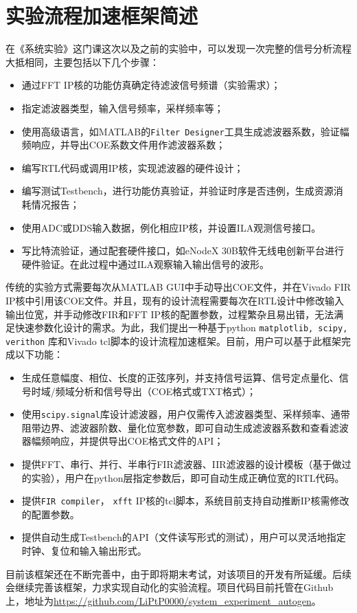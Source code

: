 \section{实验流程加速框架简述}
在《系统实验》这门课这次以及之前的实验中，可以发现一次完整的信号分析流程大抵相同，主要包括以下几个步骤：
\begin{itemize}
    \item 通过FFT IP核的功能仿真确定待滤波信号频谱（实验需求）；
    \item 指定滤波器类型，输入信号频率，采样频率等；
    \item 使用高级语言，如MATLAB的\texttt{Filter Designer}工具生成滤波器系数，验证幅频响应，并导出COE系数文件用作滤波器系数；
    \item 编写RTL代码或调用IP核，实现滤波器的硬件设计；
    \item 编写测试Testbench，进行功能仿真验证，并验证时序是否违例，生成资源消耗情况报告；
    \item 使用ADC或DDS输入数据，例化相应IP核，并设置ILA观测信号接口。
    \item 写比特流验证，通过配套硬件接口，如eNodeX 30B软件无线电创新平台进行硬件验证。在此过程中通过ILA观察输入输出信号的波形。
\end{itemize}

传统的实验方式需要每次从MATLAB GUI中手动导出COE文件，并在Vivado FIR IP核中引用该COE文件。并且，现有的设计流程需要每次在RTL设计中修改输入输出位宽，并手动修改FIR和FFT IP核的配置参数，过程繁杂且易出错，无法满足快速参数化设计的需求。为此，我们提出一种基于python \texttt{matplotlib, scipy, verithon} 库和Vivado tcl脚本的设计流程加速框架。目前，用户可以基于此框架完成以下功能：
\begin{itemize}
    \item 生成任意幅度、相位、长度的正弦序列，并支持信号运算、信号定点量化、信号时域/频域分析和信号导出（COE格式或TXT格式）；
    \item 使用\texttt{scipy.signal}库设计滤波器，用户仅需传入滤波器类型、采样频率、通带阻带边界、滤波器阶数、量化位宽参数，即可自动生成滤波器系数和查看滤波器幅频响应，并提供导出COE格式文件的API；
    \item 提供FFT、串行、并行、半串行FIR滤波器、IIR滤波器的设计模板（基于做过的实验），用户在python层指定参数后，即可自动生成正确位宽的RTL代码。
    \item 提供\texttt{FIR compiler}， \texttt{xfft} IP核的tcl脚本，系统目前支持自动推断IP核需修改的配置参数。
    \item 提供自动生成Testbench的API（文件读写形式的测试），用户可以灵活地指定时钟、复位和输入输出形式。
\end{itemize}

目前该框架还在不断完善中，由于即将期末考试，对该项目的开发有所延缓。后续会继续完善该框架，力求实现自动化的实验流程。项目代码目前托管在Github上，地址为\url{https://github.com/LiPtP0000/system_experiment_autogen}。